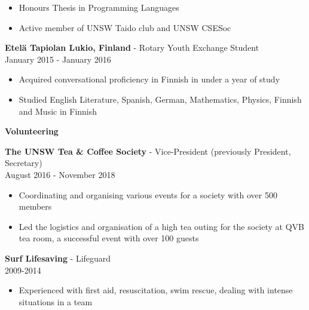 \documentclass[a4paper]{article}
\newcommand{\minititle}[1]{{\Large \begin{center} \textbf{#1} \end{center}} \vspace{0.2cm}}
\newcommand{\resumeEntry}[3]{{\large \textbf{#1} - #2} \\ \small{#3} }
\begin{document}
\begin{minipage}[t]{0.6\linewidth}
{        \begin{itemize}
            \setlength\itemsep{0.03cm}
            \item Honours Thesis in Programming Languages 
            \item Active member of UNSW Taido club and UNSW CSESoc
        \end{itemize}
        \vspace{0.4cm}
        \resumeEntry{Etel{\"a} Tapiolan Lukio, Finland}{Rotary Youth Exchange Student}{January 2015 - January 2016}
        \begin{itemize}
            \setlength\itemsep{0.03cm}
            \item Acquired conversational proficiency in Finnish in under a year of study
            \item Studied English Literature, Spanish, German, Mathematics, Physics, Finnish and Music in Finnish
        \end{itemize}
    }
    {
        \minititle{Volunteering}
        \resumeEntry{The UNSW Tea \& Coffee Society}{Vice-President (previously President, Secretary)}{August 2016 - November 2018}
        \begin{itemize}
            \setlength\itemsep{0.03cm}
            \item Coordinating and organising various events for a society with over 500 members 
            \item Led the logistics and organisation of a high tea outing for the society at QVB tea room, a successful event with over 100 guests
        \end{itemize}
        \vspace{0.4cm}
        \resumeEntry{Surf Lifesaving}{Lifeguard}{2009-2014}
        \begin{itemize}
            \item Experienced with first aid, resuscitation, swim rescue, dealing with intense situations in a team
        \end{itemize}
    }
\end{minipage}\hspace{0.8cm}
\end{document}
